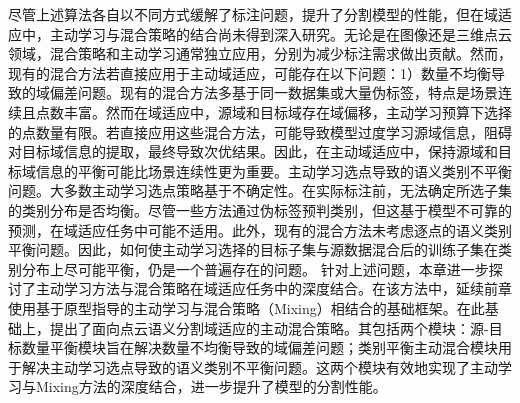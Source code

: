     尽管上述算法各自以不同方式缓解了标注问题，提升了分割模型的性能，但在域适应中，主动学习与混合策略的结合尚未得到深入研究。无论是在图像还是三维点云领域，混合策略和主动学习通常独立应用，分别为减少标注需求做出贡献。然而，现有的混合方法若直接应用于主动域适应，可能存在以下问题：1）数量不均衡导致的域偏差问题。现有的混合方法多基于同一数据集或大量伪标签，特点是场景连续且点数丰富。然而在域适应中，源域和目标域存在域偏移，主动学习预算下选择的点数量有限。若直接应用这些混合方法，可能导致模型过度学习源域信息，阻碍对目标域信息的提取，最终导致次优结果。因此，在主动域适应中，保持源域和目标域信息的平衡可能比场景连续性更为重要。主动学习选点导致的语义类别不平衡问题。大多数主动学习选点策略基于不确定性。在实际标注前，无法确定所选子集的类别分布是否均衡。尽管一些方法通过伪标签预判类别，但这基于模型不可靠的预测，在域适应任务中可能不适用。此外，现有的混合方法未考虑逐点的语义类别平衡问题。因此，如何使主动学习选择的目标子集与源数据混合后的训练子集在类别分布上尽可能平衡，仍是一个普遍存在的问题。
    针对上述问题，本章进一步探讨了主动学习方法与混合策略在域适应任务中的深度结合。在该方法中，延续前章使用基于原型指导的主动学习与混合策略（Mixing）相结合的基础框架。在此基础上，提出了面向点云语义分割域适应的主动混合策略。其包括两个模块：源-目标数量平衡模块旨在解决数量不均衡导致的域偏差问题；类别平衡主动混合模块用于解决主动学习选点导致的语义类别不平衡问题。这两个模块有效地实现了主动学习与Mixing方法的深度结合，进一步提升了模型的分割性能。
    

